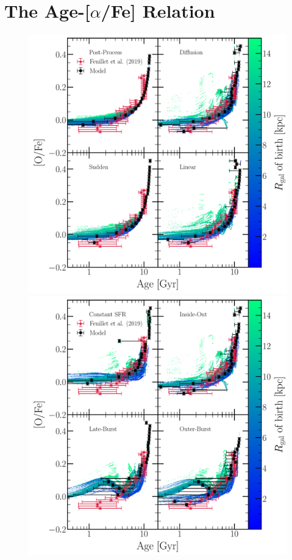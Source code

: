 \documentclass[fleqn, usenatbib]{mnras}
\begin{document}
\section{The Age-[$\alpha$/Fe] Relation} 
\label{sec:age_alpha} 

\begin{figure} 
\centering 
\includegraphics[scale = 0.34]{age_ofe_migration_comparison.pdf} 
\includegraphics[scale = 0.34]{age_ofe_sfh_comparison.pdf} 

\end{figure}
\end{document}
